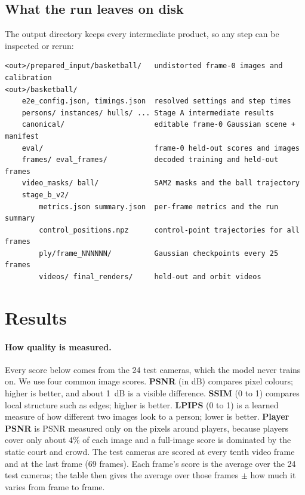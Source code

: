 \documentclass[11pt]{article}
\begin{document}
\subsection{What the run leaves on disk}
The output directory keeps every intermediate product, so any step can be inspected or rerun:
{\small\begin{verbatim}
<out>/prepared_input/basketball/   undistorted frame-0 images and calibration
<out>/basketball/
    e2e_config.json, timings.json  resolved settings and step times
    persons/ instances/ hulls/ ... Stage A intermediate results
    canonical/                     editable frame-0 Gaussian scene + manifest
    eval/                          frame-0 held-out scores and images
    frames/ eval_frames/           decoded training and held-out frames
    video_masks/ ball/             SAM2 masks and the ball trajectory
    stage_b_v2/
        metrics.json summary.json  per-frame metrics and the run summary
        control_positions.npz      control-point trajectories for all frames
        ply/frame_NNNNNN/          Gaussian checkpoints every 25 frames
        videos/ final_renders/     held-out and orbit videos
\end{verbatim}}

\section{Results}
\paragraph{How quality is measured.} Every score below comes from the 24 test cameras, which the
model never trains on. We use four common image scores. \textbf{PSNR} (in dB) compares pixel
colours; higher is better, and about 1~dB is a visible difference. \textbf{SSIM} (0 to 1) compares
local structure such as edges; higher is better. \textbf{LPIPS} (0 to 1) is a learned measure of how
different two images look to a person; lower is better. \textbf{Player PSNR} is PSNR measured only
on the pixels around players, because players cover only about 4\% of each image and a full-image
score is dominated by the static court and crowd. The test cameras are scored at every tenth video
frame and at the last frame (69 frames). Each frame's score is the average over the 24 test cameras;
the table then gives the average over those frames $\pm$ how much it varies from frame to frame.
\end{document}
